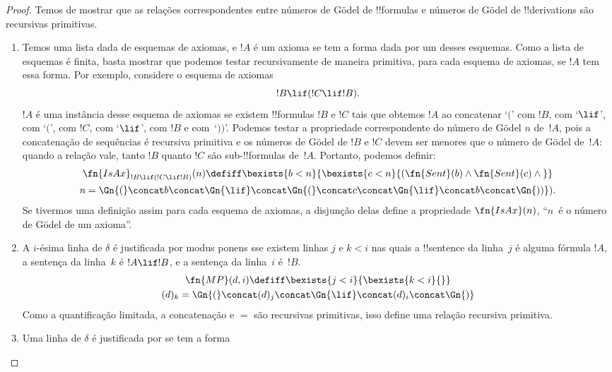 \documentclass[../../../include/open-logic-section]{subfiles}
\begin{document}
\begin{proof}
Temos de mostrar que as relações correspondentes entre números de
G\"odel de !!{formula}s e números de G\"odel de !!{derivation}s são
recursivas primitivas.
\begin{enumerate}
\item Temos uma lista dada de esquemas de axiomas, e $!A$ é um axioma
  se tem a forma dada por um desses esquemas. Como a lista de esquemas
  é finita, basta mostrar que podemos testar recursivamente de maneira
  primitiva, para cada esquema de axiomas, se $!A$ tem essa forma. Por
  exemplo, considere o esquema de axiomas
  \[
  !B \lif (!C \lif !B).
  \]
  $!A$ é uma instância desse esquema de axiomas se existem !!{formula}s
  $!B$ e $!C$ tais que obtemos $!A$ ao concatenar `$($' com $!B$, com
  `$\lif$', com `$($', com $!C$, com `$\lif$', com $!B$ e com~`$))$'.
  Podemos testar a propriedade correspondente do número de G\"odel
  $n$ de~$!A$, pois a concatenação de sequências é recursiva primitiva
  e os números de G\"odel de $!B$ e $!C$ devem ser menores que o
  número de G\"odel de~$!A$: quando a relação vale, tanto $!B$ quanto
  $!C$ são sub-!!{formula}s de~$!A$. Portanto, podemos definir:
  \begin{multline*}
  \fn{IsAx}_{!B \lif (!C \lif !B)}(n) \defiff \bexists{b< n}{
    \bexists{c < n}{(\fn{Sent}(b) \land \fn{Sent}(c) \land {}}}\\ n =
  \Gn{(} \concat b \concat \Gn{\lif} \concat \Gn{(} \concat c \concat
  \Gn{\lif} \concat b \concat \Gn{))}).
  \end{multline*}
  Se tivermos uma definição assim para cada esquema de axiomas, a
  disjunção delas define a propriedade $\fn{IsAx}(n)$, ``$n$~é o
  número de G\"odel de um axioma''.
\item A $i$-ésima linha de $\delta$ é justificada por modus ponens sse
  existem linhas $j$ e $k < i$ nas quais a !!{sentence} da linha~$j$
  é alguma fórmula $!A$, a sentença da linha~$k$ é $!A \lif
  !B$, e a sentença da linha~$i$ é~$!B$.
  \begin{multline*}
    \fn{MP}(d, i) \defiff \bexists{j < i}{\bexists{k < i}{}}\\
    (d)_k = \Gn{(} \concat (d)_j
      \concat \Gn{\lif} \concat (d)_i \concat \Gn{)}
  \end{multline*}
  Como a quantificação limitada, a concatenação e $=$ são recursivas
  primitivas, isso define uma relação recursiva primitiva.
\item Uma linha de $\delta$ é justificada por \QR{} se tem a forma

\end{enumerate}
\end{proof}
\end{document}
